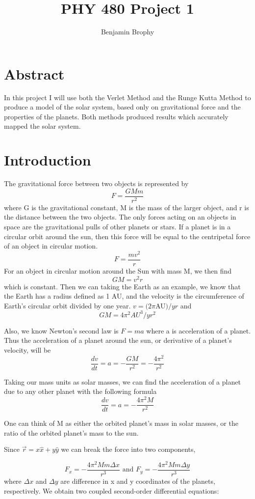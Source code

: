 \documentclass[11pt]{article}
\begin{document}
\title{PHY 480 Project 1}
\author{Benjamin Brophy}
\maketitle

\section{Abstract}
In this project I will use both the Verlet Method and the Runge Kutta Method to produce a model of the solar system, based only on gravitational force and the properties of the planets. Both methods produced results which accurately mapped the solar system.

\section{Introduction}
The gravitational force between two objects is represented by 
$$F = \frac{GMm}{r^2}$$ where G is the gravitational constant, M is the mass of the larger object, and r is the distance between the two objects.
The only forces acting on an objects in space are the gravitational pulls of other planets or stars. If a planet is in a circular orbit around the sun, then this force will be equal to the centripetal force of an object in circular motion.
$$F = \frac{mv^2}{r}$$
For an object in circular motion around the Sun with mass M, we then find 
$$GM = v^2r$$
which is constant. Then we can taking the Earth as an example, we know that the Earth has a radius defined as 1 AU, and the velocity is the circumference of Earth's circular orbit divided by one year. $v=(2\pi $AU$)/yr$ and
$$GM = 4\pi^2 AU^3/yr^2$$

Also, we know Newton's second law is $F=ma$ where a is acceleration of a planet. Thus the acceleration of a planet around the sun, or derivative of a planet's velocity, will be
$$\frac{dv}{dt} = a = -\frac{GM}{r^2} =-\frac{4\pi^2}{r^2} $$

Taking our mass units as solar masses, we can find the acceleration of a planet due to any other planet with the following formula
$$\frac{dv}{dt} = a = -\frac{4\pi^2M}{r^2} $$

One can think of M as either the orbited planet's mass in solar masses, or the ratio of the orbited planet's mass to the sun.

Since $\vec{r}=x\hat{x}+y\hat{y}$ we can break the force into two components,

$$
F_{x} = -\frac{4\pi^2Mm\Delta x}{r^{3}}\text{ and } F_{y} = -\frac{4\pi^2Mm\Delta y}{r^{3}}
$$
where $\Delta x$ and $\Delta y$ are difference in x and y coordinates of the planets, respectively.
We obtain two coupled second-order differential equations:
\end{document}
